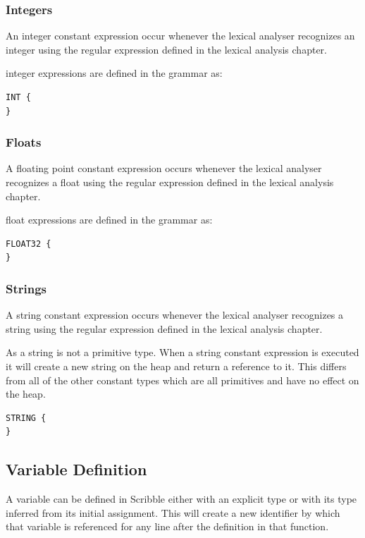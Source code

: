 \documentclass[]{final_report}
\begin{document}
\subsubsection{Integers}

An integer constant expression occur whenever the lexical analyser recognizes an integer using the regular expression defined in the lexical analysis chapter.

integer expressions are defined in the grammar as:
\begin{verbatim}
INT {
}
\end{verbatim}

\subsubsection{Floats}

A floating point constant expression occurs whenever the lexical analyser recognizes a float using the regular expression defined in the lexical analysis chapter.

float expressions are defined in the grammar as:
\begin{verbatim}
FLOAT32 {
}
\end{verbatim}

\subsubsection{Strings}

A string constant expression occurs whenever the lexical analyser recognizes a string using the regular expression defined in the lexical analysis chapter.

As a string is not a primitive type. When a string constant expression is executed it will create a new string on the heap and return a reference to it. This differs from all of the other constant types which are all primitives and have no effect on the heap.

\begin{verbatim}
STRING {
}
\end{verbatim}

\subsection{Variable Definition}

A variable can be defined in Scribble either with an explicit type or with its type inferred from its initial assignment. This will create a new identifier by which that variable is referenced for any line after the definition in that function.
\end{document}
